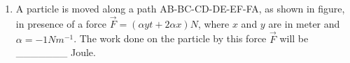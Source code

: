 
\begin{enumerate}
    \item A particle is moved along a path AB-BC-CD-DE-EF-FA, as shown in figure, in presence of a force $\vec{F} = (\alpha y t + 2 \alpha x) N$, where $x$ and $y$ are in meter and $\alpha = -1 Nm^{-1}$. The work done on the particle by this force $\vec{F}$ will be \_\_\_\_\_\_\_ Joule.
    
\begin{center}
\end{center}
    
\end{enumerate}
